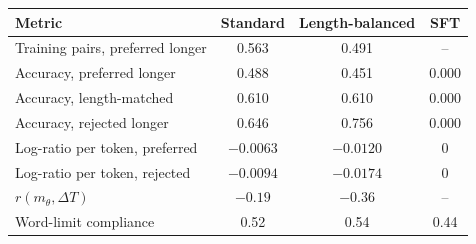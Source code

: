 \begin{tabular}{l c c c}
  \toprule
  \textbf{Metric} & \textbf{Standard} & \textbf{Length-balanced} & \textbf{SFT} \\
  \midrule
    Training pairs, preferred longer & 0.563 & 0.491 & -- \\
  \midrule
    Accuracy, preferred longer & 0.488 & 0.451 & 0.000 \\
    Accuracy, length-matched & 0.610 & 0.610 & 0.000 \\
    Accuracy, rejected longer & 0.646 & 0.756 & 0.000 \\
  \midrule
    Log-ratio per token, preferred & $-0.0063$ & $-0.0120$ & $0$ \\
    Log-ratio per token, rejected & $-0.0094$ & $-0.0174$ & $0$ \\
    $r(m_\theta, \Delta T)$ & $-0.19$ & $-0.36$ & -- \\
  \midrule
    Word-limit compliance & 0.52 & 0.54 & 0.44 \\
  \bottomrule
\end{tabular}
